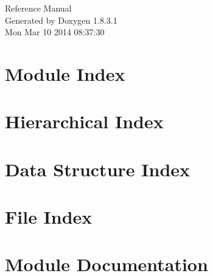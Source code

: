 \documentclass{book}
\begin{document}
\hypersetup{pageanchor=false,citecolor=blue}
\begin{titlepage}
\vspace*{7cm}
\begin{center}
{\Large Reference Manual}\\
\vspace*{1cm}
{\large Generated by Doxygen 1.8.3.1}\\
\vspace*{0.5cm}
{\small Mon Mar 10 2014 08:37:30}\\
\end{center}
\end{titlepage}
\clearemptydoublepage
{}
\tableofcontents
\clearemptydoublepage
{}
\hypersetup{pageanchor=true,citecolor=blue}
\chapter{Module Index}

\chapter{Hierarchical Index}

\chapter{Data Structure Index}

\chapter{File Index}

\chapter{Module Documentation}

\end{document}
